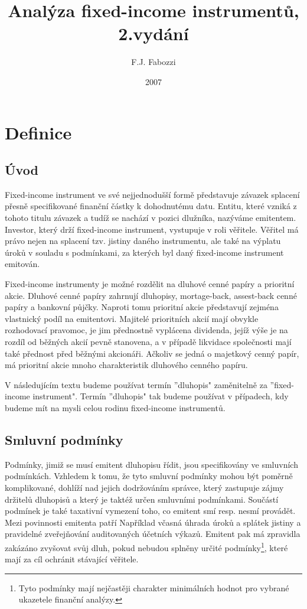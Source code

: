 \documentclass[a4paper]{book}
\begin{document}
\title{Analýza fixed-income instrumentů, 2.vydání}
\author{F.J. Fabozzi}
\date{2007}
\maketitle

\tableofcontents

\chapter{Definice}

\section{Úvod}

Fixed-income instrument ve své nejjednodušší formě představuje závazek splacení přesně specifikované finanční částky k dohodnutému datu. Entitu, které vzniká z tohoto titulu závazek a tudíž se nachází v pozici dlužníka, nazýváme emitentem. Investor, který drží fixed-income instrument, vystupuje v roli věřitele. Věřitel má právo nejen na splacení tzv. jistiny daného instrumentu, ale také na výplatu úroků v souladu s podmínkami, za kterých byl daný fixed-income instrument emitován.

Fixed-income instrumenty je možné rozdělit na dluhové cenné papíry a prioritní akcie. Dluhové cenné papíry zahrnují dluhopisy, mortage-back, assest-back cenné papíry a bankovní půjčky. Naproti tomu prioritní akcie představují zejména vlastnický podíl na emitentovi. Majitelé  prioritních akcií mají obvykle rozhodovací pravomoc, je jim přednostně vyplácena dividenda, jejíž výše je na rozdíl od běžných akcií pevně stanovena, a v případě likvidace společnosti mají také přednost před běžnými akcionáři. Ačkoliv se jedná o majetkový cenný papír, má prioritní akcie mnoho charakteristik dluhového cenného papíru.

V následujícím textu budeme používat termín ''dluhopis" zaměnitelně za ''fixed-income instrument". Termín ''dluhopis" tak budeme používat v případech, kdy budeme mít na mysli celou rodinu fixed-income instrumentů.

\section{Smluvní podmínky}

Podmínky, jimiž se musí emitent dluhopisu řídit, jsou specifikovány ve smluvních podmínkách. Vzhledem k tomu, že tyto smluvní podmínky mohou být poměrně komplikované, dohlíží nad jejich dodržováním správce, který zastupuje zájmy držitelů dluhopisů a který je taktéž určen smluvními podmínkami. Součástí podmínek je také taxativní vymezení toho, co emitent smí resp. nesmí provádět. Mezi povinnosti emitenta patří Například včasná úhrada úroků a splátek jistiny a pravidelné zveřejňování auditovaných účetních výkazů. Emitent pak má zpravidla zakázáno zvyšovat svůj dluh, pokud nebudou splněny určité podmínky\footnote{Tyto podmínky mají nejčastěji charakter minimálních hodnot pro vybrané ukazetele finanční analýzy.}, které mají za cíl ochránit stávající věřitele.
\end{document}
